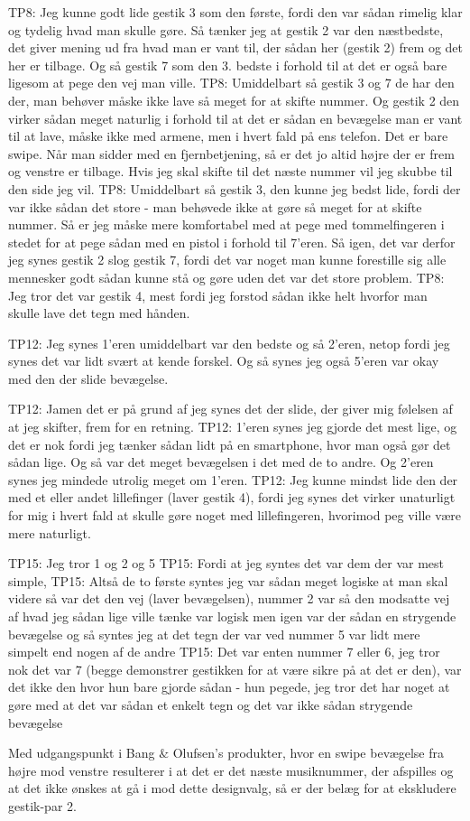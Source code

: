 TP8: Jeg kunne godt lide gestik 3 som den første, fordi den var sådan rimelig klar og tydelig hvad man skulle gøre. Så tænker jeg at gestik 2 var den næstbedste, det giver mening ud fra hvad man er vant til, der sådan her (gestik 2) frem og det her er tilbage. Og så gestik 7 som den 3. bedste i forhold til at det er også bare ligesom at pege den vej man ville. 
TP8: Umiddelbart så gestik 3 og 7 de har den der, man behøver måske ikke lave så meget for at skifte nummer. Og gestik 2 den virker sådan meget naturlig i forhold til at det er sådan en bevægelse man er vant til at lave, måske ikke med armene, men i hvert fald på ens telefon. Det er bare swipe. Når man sidder med en fjernbetjening, så er det jo altid højre der er frem og venstre er tilbage. Hvis jeg skal skifte til det næste nummer vil jeg skubbe til den side jeg vil. 
TP8: Umiddelbart så gestik 3, den kunne jeg bedst lide, fordi der var ikke sådan det store - man behøvede ikke at gøre så meget for at skifte nummer. Så er jeg måske mere komfortabel med at pege med tommelfingeren i stedet for at pege sådan med en pistol i forhold til 7’eren. Så igen, det var derfor jeg synes gestik 2 slog gestik 7, fordi det var noget man kunne forestille sig alle mennesker godt sådan kunne stå og gøre uden det var det store problem. 
TP8: Jeg tror det var gestik 4, mest fordi jeg forstod sådan ikke helt hvorfor man skulle lave det tegn med hånden.



TP12: Jeg synes 1’eren umiddelbart var den bedste og så 2’eren, netop fordi jeg synes det var lidt svært at kende forskel. Og så synes jeg også 5’eren var okay med den der slide bevægelse. 

TP12: Jamen det er på grund af jeg synes det der slide, der giver mig følelsen af at jeg skifter, frem for en retning. 
TP12: 1’eren synes jeg gjorde det mest lige, og det er nok fordi jeg tænker sådan lidt på en smartphone, hvor man også gør det sådan lige. Og så var det meget bevægelsen i det med de to andre. Og 2’eren synes jeg mindede utrolig meget om 1’eren.
TP12:  Jeg kunne mindst lide den der med et eller andet lillefinger (laver gestik 4), fordi jeg synes det virker unaturligt for mig i hvert fald at skulle gøre noget med lillefingeren, hvorimod peg ville være mere naturligt. 


TP15: Jeg tror 1 og 2 og 5
TP15: Fordi at jeg syntes det var dem der var mest simple, 
TP15: Altså de to første syntes jeg var sådan meget logiske at man skal videre så var det den vej (laver bevægelsen), nummer 2 var så den modsatte vej af hvad jeg sådan lige ville tænke var logisk men igen var der sådan en strygende bevægelse og så syntes jeg at det tegn der var ved nummer 5 var lidt mere simpelt end nogen af de andre
TP15: Det var enten nummer 7 eller 6, jeg tror nok det var 7 (begge demonstrer gestikken for at være sikre på at det er den), var det ikke den hvor hun bare gjorde sådan - hun pegede, jeg tror det har noget at gøre med at det var sådan et enkelt tegn og det var ikke sådan strygende bevægelse 






Med udgangspunkt i Bang $\&$ Olufsen's produkter, hvor en swipe bevægelse fra højre mod venstre resulterer i at det er det næste musiknummer, der afspilles og at det ikke ønskes at gå i mod dette designvalg, så er der belæg for at ekskludere gestik-par 2.  









